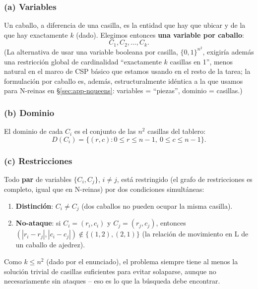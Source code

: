 \documentclass[11pt,onecolumn,letterpaper]{article}
\begin{document}
\subsubsection*{(a) Variables}

Un caballo, a diferencia de una casilla, es la entidad que hay que ubicar y de la que hay
exactamente $k$ (dado). Elegimos entonces \textbf{una variable por caballo}:
$$C_1, C_2, \dots, C_k.$$
(La alternativa de usar una variable booleana por casilla, $\{0,1\}^{n^2}$, exigir\'ia
adem\'as una restricci\'on global de cardinalidad ``exactamente $k$ casillas en 1'', menos
natural en el marco de CSP b\'asico que estamos usando en el resto de la tarea; la
formulaci\'on por caballo es, adem\'as, estructuralmente id\'entica a la que usamos para
N-reinas en \S\ref{sec:app-nqueens}: variables = ``piezas'', dominio = casillas.)

\subsubsection*{(b) Dominio}

El dominio de cada $C_i$ es el conjunto de las $n^2$ casillas del tablero:
$$D(C_i) = \{(r,c) : 0\le r\le n-1,\ 0\le c\le n-1\}.$$

\subsubsection*{(c) Restricciones}

Todo \textbf{par} de variables $\{C_i,C_j\}$, $i\neq j$, est\'a restringido (el grafo de
restricciones es completo, igual que en N-reinas) por dos condiciones simult\'aneas:
\begin{enumerate}[label=(\roman*)]
\item \textbf{Distinci\'on}: $C_i \neq C_j$ (dos caballos no pueden ocupar la misma
  casilla).
\item \textbf{No-ataque}: si $C_i=(r_i,c_i)$ y $C_j=(r_j,c_j)$, entonces
  $(|r_i-r_j|,|c_i-c_j|) \notin \{(1,2),(2,1)\}$ (la relaci\'on de movimiento en L de un
  caballo de ajedrez).
\end{enumerate}
Como $k\le n^2$ (dado por el enunciado), el problema siempre tiene al menos la soluci\'on
trivial de casillas suficientes para evitar solaparse, aunque no necesariamente sin
ataques -- eso es lo que la b\'usqueda debe encontrar.
\end{document}
